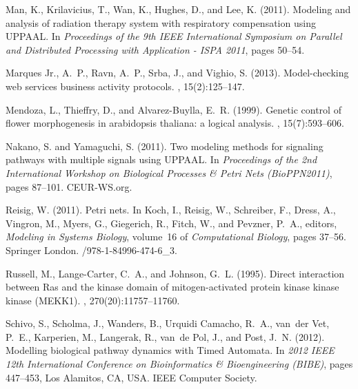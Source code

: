 \documentclass{bmcart}
\begin{document}
\begin{backmatter}
\begin{thebibliography}{}
Man, K., Krilavicius, T., Wan, K., Hughes, D., and Lee, K. (2011).
\newblock Modeling and analysis of radiation therapy system with respiratory
  compensation using {UPPAAL}.
\newblock In {\em Proceedings of the 9th IEEE International Symposium on
  Parallel and Distributed Processing with Application - {ISPA} 2011}, pages
  50--54.

{Marques Jr.}, A.~P., Ravn, A.~P., Srba, J., and Vighio, S. (2013).
\newblock Model-checking web services business activity protocols.
, 15(2):125--147.

Mendoza, L., Thieffry, D., and Alvarez-Buylla, E.~R. (1999).
\newblock Genetic control of flower morphogenesis in arabidopsis thaliana: a
  logical analysis.
, 15(7):593--606.

Nakano, S. and Yamaguchi, S. (2011).
\newblock Two modeling methods for signaling pathways with multiple signals
  using {UPPAAL}.
\newblock In {\em Proceedings of the 2nd International Workshop on Biological
  Processes \& Petri Nets {(BioPPN2011)}}, pages 87--101. CEUR-WS.org.

Reisig, W. (2011).
\newblock Petri nets.
\newblock In Koch, I., Reisig, W., Schreiber, F., Dress, A., Vingron, M.,
  Myers, G., Giegerich, R., Fitch, W., and Pevzner, P.~A., editors, {\em
  Modeling in Systems Biology}, volume~16 of {\em Computational Biology}, pages
  37--56. Springer London.
/978-1-84996-474-6\_3.

Russell, M., Lange-Carter, C.~A., and Johnson, G.~L. (1995).
\newblock Direct interaction between {Ras} and the kinase domain of
  mitogen-activated protein kinase kinase kinase ({MEKK1}).
, 270(20):11757--11760.

Schivo, S., Scholma, J., Wanders, B., {Urquidi Camacho}, R.~A., van~der Vet,
  P.~E., Karperien, M., Langerak, R., van~de Pol, J., and Post, J.~N. (2012).
\newblock Modelling biological pathway dynamics with {Timed Automata}.
\newblock In {\em 2012 IEEE 12th International Conference on Bioinformatics \&
  Bioengineering (BIBE)}, pages 447--453, Los Alamitos, CA, USA. IEEE Computer
  Society.


\end{thebibliography}
\end{backmatter}
\end{document}
